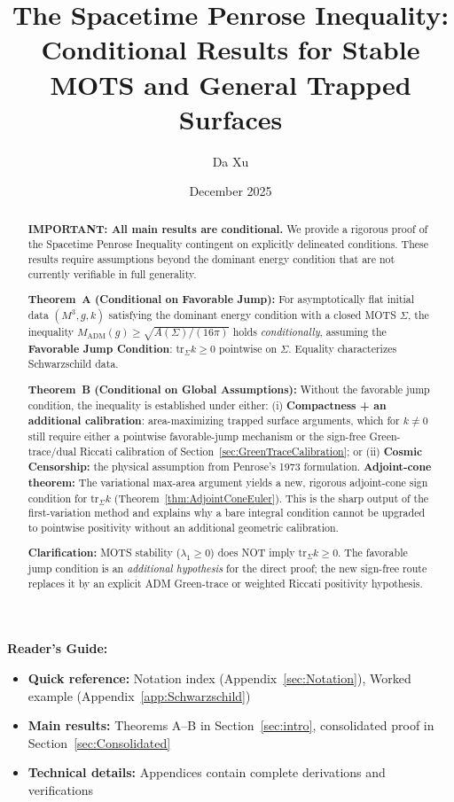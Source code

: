 \documentclass[11pt]{amsart}
\title[Spacetime Penrose Inequality---Conditional]{The Spacetime Penrose Inequality: Conditional Results for Stable MOTS and General Trapped Surfaces}
\author{Da Xu}
\date{December 2025}
\theoremstyle{plain}
\theoremstyle{definition}
\theoremstyle{remark}
\theoremstyle{plain}
\numberwithin{equation}{section}
\newcommand{\tr}{\mathrm{tr}}
\begin{document}
\begin{abstract}
\textbf{IMPORTANT: All main results are conditional.} We provide a rigorous proof of the Spacetime Penrose Inequality contingent on explicitly delineated conditions. These results require assumptions beyond the dominant energy condition that are not currently verifiable in full generality.

\textbf{Theorem~A (Conditional on Favorable Jump):} For asymptotically flat initial data $(M^3,g,k)$ satisfying the dominant energy condition with a closed MOTS $\Sigma$, the inequality $M_{\mathrm{ADM}}(g) \ge \sqrt{A(\Sigma)/(16\pi)}$ holds \emph{conditionally}, assuming the \textbf{Favorable Jump Condition}: $\tr_\Sigma k \ge 0$ pointwise on $\Sigma$. Equality characterizes Schwarzschild data.

\textbf{Theorem~B (Conditional on Global Assumptions):} Without the favorable jump condition, the inequality is established under either: (i) \textbf{Compactness + an additional calibration}: area-maximizing trapped surface arguments, which for $k \neq 0$ still require either a pointwise favorable-jump mechanism or the sign-free Green-trace/dual Riccati calibration of Section~\ref{sec:GreenTraceCalibration}; or (ii) \textbf{Cosmic Censorship:} the physical assumption from Penrose's 1973 formulation.
\textbf{Adjoint-cone theorem:} The variational max-area argument yields a new, rigorous adjoint-cone sign condition for $\tr_\Sigma k$ (Theorem~\ref{thm:AdjointConeEuler}). This is the sharp output of the first-variation method and explains why a bare integral condition cannot be upgraded to pointwise positivity without an additional geometric calibration.

\textbf{Clarification:} MOTS stability ($\lambda_1 \ge 0$) does NOT imply $\tr_\Sigma k \ge 0$. The favorable jump condition is an \emph{additional hypothesis} for the direct proof; the new sign-free route replaces it by an explicit ADM Green-trace or weighted Riccati positivity hypothesis.
\end{abstract}

\maketitle

\setcounter{tocdepth}{2}
\tableofcontents

\vspace{1em}
\noindent\textbf{Reader's Guide:}
\begin{itemize}
    \item \textbf{Quick reference:} Notation index (Appendix~\ref{sec:Notation}), Worked example (Appendix~\ref{app:Schwarzschild})
    \item \textbf{Main results:} Theorems A--B in Section~\ref{sec:intro}, consolidated proof in Section~\ref{sec:Consolidated}
    \item \textbf{Technical details:} Appendices contain complete derivations and verifications
\end{itemize}
\end{document}
